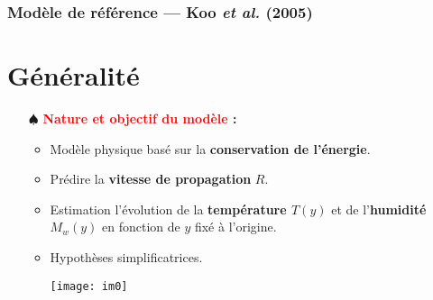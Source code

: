\documentclass[handout]{beamer}
\newtheorem{pbm et hypo}[thm]{Problématique et hypothèses}
\begin{document}
	\begin{frame}
		\frametitle{Modèle de référence — Koo \textit{et al.} (2005)}
		\section{Généralité}
		\begin{itemize}
			\item[$\spadesuit$] \textbf{\textcolor{red}{Nature et objectif du modèle} : } \pause 
			\begin{itemize}
				\item Modèle physique basé sur la \textbf{conservation de l'énergie}. \pause
				\item Prédire la \textbf{vitesse de propagation} $R$. \pause
				\item Estimation l'évolution de la \textbf{température $T(y)$} et de l'\textbf{humidité $M_w(y)$} en fonction de $y$ fixé à l'origine. \pause
				
				\vspace{1ex}
				\item Hypothèses simplificatrices. \pause %
				
				\pause[2]
				\begin{center}
					\texttt{[image: im0]}
				\end{center}
				
				
			\end{itemize}
		\end{itemize}
	\end{frame}
\end{document}
